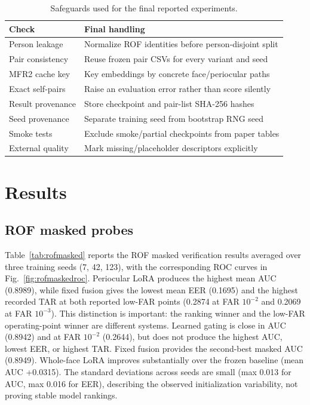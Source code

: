 \documentclass[10pt,journal,compsoc]{IEEEtran}
\begin{document}
\begin{table}[t]
\centering
\caption{Safeguards used for the final reported experiments.}
\label{tab:safeguards}
\begin{tabular}{p{}p{}}
\toprule
Check & Final handling\\
\midrule
Person leakage & Normalize ROF identities before person-disjoint split\\
Pair consistency & Reuse frozen pair CSVs for every variant and seed\\
MFR2 cache key & Key embeddings by concrete face/periocular paths\\
Exact self-pairs & Raise an evaluation error rather than score silently\\
Result provenance & Store checkpoint and pair-list SHA-256 hashes\\
Seed provenance & Separate training seed from bootstrap RNG seed\\
Smoke tests & Exclude smoke/partial checkpoints from paper tables\\
External quality & Mark missing/placeholder descriptors explicitly\\
\bottomrule
\end{tabular}
\end{table}

\section{Results}
\subsection{ROF masked probes}
Table~\ref{tab:rofmasked} reports the ROF masked verification results averaged over three training seeds (7, 42, 123), with the corresponding ROC curves in Fig.~\ref{fig:rofmaskedroc}. Periocular LoRA produces the highest mean AUC (0.8989), while fixed fusion gives the lowest mean EER (0.1695) and the highest recorded TAR at both reported low-FAR points (0.2874 at FAR $10^{-2}$ and 0.2069 at FAR $10^{-3}$). This distinction is important: the ranking winner and the low-FAR operating-point winner are different systems. Learned gating is close in AUC (0.8942) and at FAR $10^{-2}$ (0.2644), but does not produce the highest AUC, lowest EER, or highest TAR. Fixed fusion provides the second-best masked AUC (0.8949). Whole-face LoRA improves substantially over the frozen baseline (mean AUC +0.0315). The standard deviations across seeds are small (max 0.013 for AUC, max 0.016 for EER), describing the observed initialization variability, not proving stable model rankings.
\end{document}
